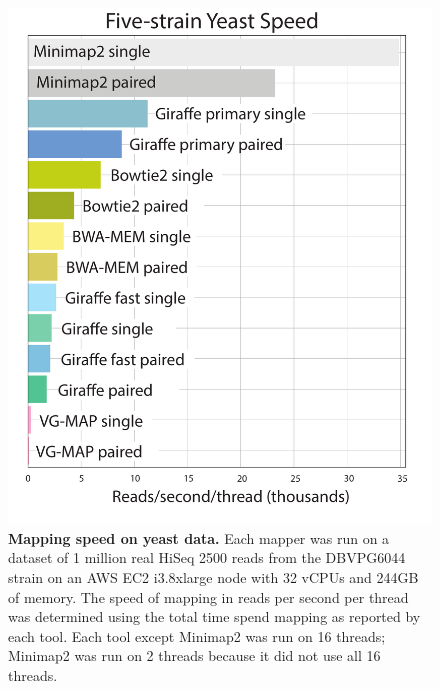 \documentclass[11pt]{ucscthesis}
\begin{document}
\begin{figure}[p]
    \centering
    \includegraphics[width=.7\linewidth]{speed_yeast.pdf}
    \caption[Mapping speed on yeast data]{\textbf{Mapping speed on yeast data.} Each mapper was run on a dataset of 1 million real HiSeq 2500 reads from the DBVPG6044 strain on an AWS EC2 i3.8xlarge node with 32 vCPUs and 244GB of memory. The speed of mapping in reads per second per thread was determined using the total time spend mapping as reported by each tool. Each tool except Minimap2 was run on 16 threads; Minimap2 was run on 2 threads because it did not use all 16 threads.}
    \label{fig:speed_yeast}
\end{figure}
\end{document}
